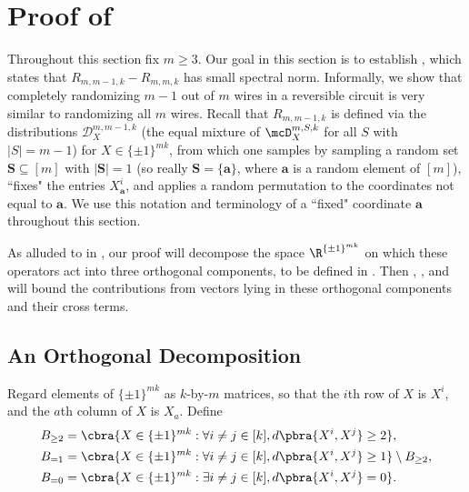 \section{Proof of }\label{sec:small k}
Throughout this section fix $m\geq 3$. Our goal in this section is to establish , which states that $R_{m,m-1,k}-R_{m,m,k}$ has small spectral norm. Informally, we show that completely randomizing $m-1$ out of $m$ wires in a reversible circuit is very similar to randomizing all $m$ wires. Recall that $R_{m,m-1,k}$ is defined via the distributions $\mathcal{D}_X^{m,m-1,k}$ (the equal mixture of $\mcD_X^{m,S,k}$ for all $S$ with $|S|=m-1$) for $X\in\{\pm1\}^{mk}$, from which one samples by sampling a random set $\mathbf{S}\subseteq [m]$ with $|\mathbf{S}|=1$ (so really $\mathbf{S}=\{\mathbf{a}\}$, where $\mathbf{a}$ is a random element of $[m]$), ``fixes" the entries $X^i_{\mathbf{a}}$, and applies a random permutation to the coordinates not equal to $\mathbf{a}$. We use this notation and terminology of a ``fixed" coordinate $\mathbf{a}$ throughout this section.

As alluded to in , our proof will decompose the space $\R^{\{\pm1\}^{mk}}$ on which these operators act into three orthogonal components, to be defined in . Then , , and  will bound the contributions from vectors lying in these orthogonal components and their cross terms.



\subsection{An Orthogonal Decomposition}\label{sec:decomposition}
\begin{definition}
    Regard elements of $\{\pm1\}^{mk}$ as $k$-by-$m$ matrices, so that the $i$th row of $X$ is $X^i$, and the $a$th column of $X$ is $X_a$. Define 
    \begin{align*}
        B_{\geq 2}&=\cbra{X\in\{\pm1\}^{mk}:\forall i\neq j\in[k], d\pbra{X^i, X^j}\geq 2},\\
        B_{=1}&=\cbra{X\in\{\pm1\}^{mk}:\forall i\neq j\in[k], d\pbra{X^i, X^j}\geq 1}\setminus B_{\geq 2},\\
        B_{=0}&=\cbra{X\in\{\pm1\}^{mk}:\exists i\neq j\in[k], d\pbra{X^i, X^j}=0}.
    \end{align*}
\end{definition}

